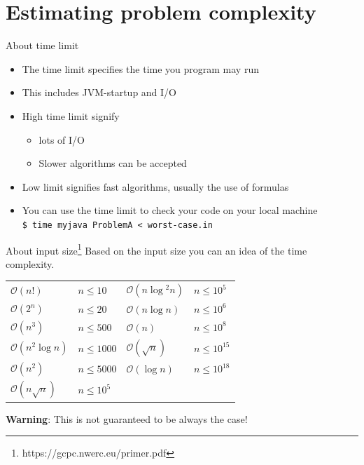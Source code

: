 \documentclass[11pt,pdf, aspectratio=169]{beamer}
\begin{document}
  \section{Estimating problem complexity}
  \begin{frame}{About time limit}
    \begin{itemize}
      \item The time limit specifies the time you program may run
      \item This includes JVM-startup and I/O
      \item High time limit signify \begin{itemize}
                                      \item lots of I/O
                                      \item Slower algorithms can be accepted
      \end{itemize}
      \item Low limit signifies fast algorithms, usually the use of formulas
      \item You can use the time limit to check your code on your local machine\\
      \texttt{\$ time myjava ProblemA < worst-case.in}
    \end{itemize}
  \end{frame}
  \begin{frame}{About input size\footnote[1]{https://gcpc.nwerc.eu/primer.pdf}}
    Based on the input size you can an idea of the time complexity.

    \begin{center}
      \begin{tabular}{llll}
        \hline
        $\mathcal{O}(n!)$         & $n \leq 10$   & $\mathcal{O}(n\log{}^{2}n)$ & $n \leq 10^5$    \\
        $\mathcal{O}(2^n)$        & $n \leq 20$   & $\mathcal{O}(n\log{}n)$     & $n \leq 10^6$    \\
        $\mathcal{O}(n^3)$        & $n \leq 500$  & $\mathcal{O}(n)$            & $n \leq 10^8$    \\
        $\mathcal{O}(n^2\log{}n)$ & $n \leq 1000$ & $\mathcal{O}(\sqrt{n})$     & $n \leq 10^{15}$ \\
        $\mathcal{O}(n^2)$        & $n \leq 5000$ & $\mathcal{O}(\log{}n)$      & $n \leq 10^{18}$ \\
        $\mathcal{O}(n\sqrt {n})$ & $n \leq 10^5$ &                             &                  \\
        \hline
      \end{tabular}
    \end{center}

    \textbf{Warning}: This is not guaranteed to be always the case!
  \end{frame}
\end{document}

